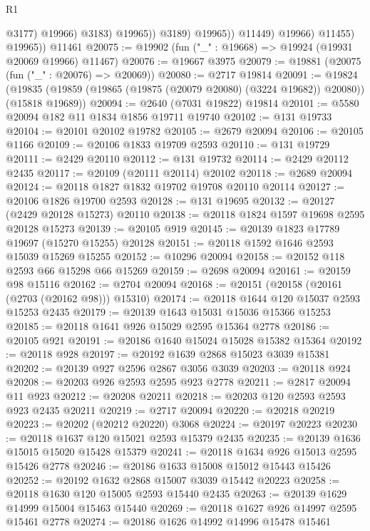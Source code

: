 \begin{lexlean}{R1}
\begin{coremodule}
                              @3177)
                            @19966)
                          @3183)
                        @19965))
                    @3189)
                  @19965))
              @11449)
            @19966)
          @11455)
        @19965))
    @11461
@20075 := @19902 (fun ("_" : @19668) => @19924 (@19931 @20069 @19966) @11467)
@20076 := @19667 @3975
@20079 := @19881 (@20075 (fun ("_" : @20076) => @20069))
@20080 := @2717 @19814
@20091 := @19824
    (@19835 (@19859 (@19865 (@19875 (@20079 @20080) (@3224 @19682)) @20080)) (@15818 @19689))
@20094 := @2640 (@7031 @19822) @19814
@20101 := @5580 @20094 @182 @11 @1834 @1856 @19711 @19740
@20102 := @131 @19733
@20104 := @20101 @20102 @19782
@20105 := @2679 @20094
@20106 := @20105 @1166
@20109 := @20106 @1833 @19709 @2593
@20110 := @131 @19729
@20111 := @2429 @20110
@20112 := @131 @19732
@20114 := @2429 @20112 @2435
@20117 := @20109 (@20111 @20114) @20102
@20118 := @2689 @20094
@20124 := @20118 @1827 @1832 @19702 @19708 @20110 @20114
@20127 := @20106 @1826 @19700 @2593
@20128 := @131 @19695
@20132 := @20127 (@2429 @20128 @15273) @20110
@20138 := @20118 @1824 @1597 @19698 @2595 @20128 @15273
@20139 := @20105 @919
@20145 := @20139 @1823 @17789 @19697 (@15270 @15255) @20128
@20151 := @20118 @1592 @1646 @2593 @15039 @15269 @15255
@20152 := @10296 @20094
@20158 := @20152 @118 @2593 @66 @15298 @66 @15269
@20159 := @2698 @20094
@20161 := @20159 @98 @15116
@20162 := @2704 @20094
@20168 := @20151 (@20158 (@20161 (@2703 (@20162 @98))) @15310)
@20174 := @20118 @1644 @120 @15037 @2593 @15253 @2435
@20179 := @20139 @1643 @15031 @15036 @15366 @15253
@20185 := @20118 @1641 @926 @15029 @2595 @15364 @2778
@20186 := @20105 @921
@20191 := @20186 @1640 @15024 @15028 @15382 @15364
@20192 := @20118 @928
@20197 := @20192 @1639 @2868 @15023 @3039 @15381
@20202 := @20139 @927 @2596 @2867 @3056 @3039
@20203 := @20118 @924
@20208 := @20203 @926 @2593 @2595 @923 @2778
@20211 := @2817 @20094 @11 @923
@20212 := @20208 @20211
@20218 := @20203 @120 @2593 @2593 @923 @2435 @20211
@20219 := @2717 @20094
@20220 := @20218 @20219
@20223 := @20202 (@20212 @20220) @3068
@20224 := @20197 @20223
@20230 := @20118 @1637 @120 @15021 @2593 @15379 @2435
@20235 := @20139 @1636 @15015 @15020 @15428 @15379
@20241 := @20118 @1634 @926 @15013 @2595 @15426 @2778
@20246 := @20186 @1633 @15008 @15012 @15443 @15426
@20252 := @20192 @1632 @2868 @15007 @3039 @15442 @20223
@20258 := @20118 @1630 @120 @15005 @2593 @15440 @2435
@20263 := @20139 @1629 @14999 @15004 @15463 @15440
@20269 := @20118 @1627 @926 @14997 @2595 @15461 @2778
@20274 := @20186 @1626 @14992 @14996 @15478 @15461

\end{coremodule}
\end{lexlean}
